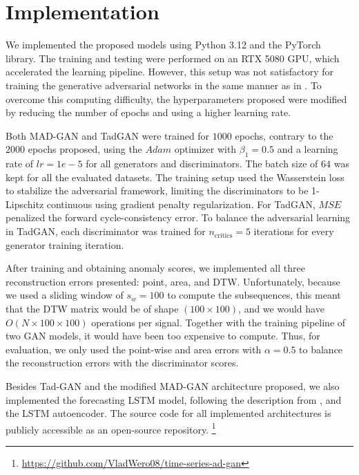 \section{Implementation}
\label{sec:04-implementation}
We implemented the proposed models using Python 3.12 and the PyTorch library. The training and testing were performed on an RTX 5080 GPU, which accelerated the learning pipeline. However, this setup was not satisfactory for training the generative adversarial networks in the same manner as in \cite{geiger2020tadgan}. To overcome this computing difficulty, the hyperparameters proposed were modified by reducing the number of epochs and using a higher learning rate.

Both MAD-GAN and TadGAN were trained for $1000$ epochs, contrary to the $2000$ epochs proposed, using the $Adam$ optimizer with $\beta_1 = 0.5$ and a learning rate of $lr = 1e-5$ for all generators and discriminators. The batch size of $64$ was kept for all the evaluated datasets. The training setup used the Wasserstein loss to stabilize the adversarial framework, limiting the discriminators to be 1-Lipschitz continuous using gradient penalty regularization. For TadGAN, $MSE$ penalized the forward cycle-consistency error. To balance the adversarial learning in TadGAN, each discriminator was trained for $n_{\text{critics}} = 5$ iterations for every generator training iteration.

After training and obtaining anomaly scores, we implemented all three reconstruction errors presented: point, area, and DTW. Unfortunately, because we used a sliding window of $s_w=100$ to compute the subsequences, this meant that the DTW matrix would be of shape $(100 \times 100)$, and we would have $O(N \times 100 \times 100)$ operations per signal. Together with the training pipeline of two GAN models, it would have been too expensive to compute. Thus, for evaluation, we only used the point-wise and area errors with $\alpha = 0.5$ to balance the reconstruction errors with the discriminator scores.

Besides Tad-GAN and the modified MAD-GAN architecture proposed, we also implemented the forecasting LSTM model, following the description from \cite{hundman2018detecting}, and the LSTM autoencoder. The source code for all implemented architectures is publicly accessible as an open-source repository. \footnote{\url{https://github.com/VladWero08/time-series-ad-gan}}
